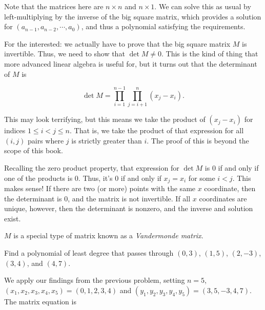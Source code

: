 \documentclass[../gatm_answers.tex]{subfiles}
\begin{document}
Note that the matrices here are $n\times n$ and $n\times 1$. We can solve this as usual by left-multiplying by the inverse of the big square matrix, which provides a solution for $(a_{n-1}, a_{n-2}, \cdots, a_0)$, and thus a polynomial satisfying the requirements.

For the interested: we actually have to prove that the big square matrix $M$ is invertible. Thus, we need to show that $\det M \neq 0$. This is the kind of thing that more advanced linear algebra is useful for, but it turns out that the determinant of $M$ is

$$\det M = \prod _ {i=1} ^ {n-1} \prod_{j=i+1} ^ {n} (x_j - x_i).$$

This may look terrifying, but this means we take the product of $(x_j - x_i)$ for indices $1\leq i < j\leq n$. That is, we take the product of that expression for all $(i,j)$ pairs where $j$ is strictly greater than $i$. The proof of this is beyond the scope of this book.

Recalling the zero product property, that expression for $\det M$ is $0$ if and only if one of the products is $0$. Thus, it's $0$ if and only if $x_j = x_i$ for some $i<j$. This makes sense! If there are two (or more) points with the same $x$ coordinate, then the determinant is $0$, and the matrix is not invertible. If all $x$ coordinates are unique, however, then the determinant is nonzero, and the inverse and solution exist.

$M$ is a special type of matrix known as a \textit{Vandermonde matrix}.

\begin{inner_problem}
\item Find a polynomial of least degree that passes through $(0,3)$, $(1,5)$, $(2,-3)$, $(3,4)$, and $(4,7)$.
\end{inner_problem}

We apply our findings from the previous problem, setting $n=5$, $(x_1,x_2,x_3,x_4,x_5)=(0,1,2,3,4)$ and $(y_1,y_2,y_3,y_4,y_5)=(3,5,-3,4,7)$. The matrix equation is
\end{document}
